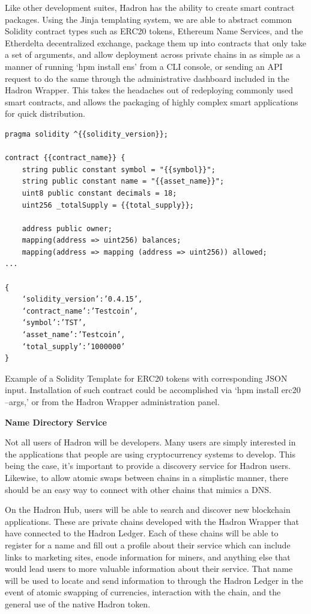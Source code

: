 \documentclass{article}
\begin{document}
Like other development suites, Hadron has the ability to create smart contract packages. Using the Jinja templating system, we are able to abstract common Solidity contract types such as ERC20 tokens, Ethereum Name Services, and the Etherdelta decentralized exchange, package them up into contracts that only take a set of arguments, and allow deployment across private chains in as simple as a manner of running ‘hpm install ens’ from a CLI console, or sending an API request to do the same through the administrative dashboard included in the Hadron Wrapper. This takes the headaches out of redeploying commonly used smart contracts, and allows the packaging of highly complex smart applications for quick distribution.

\begin{verbatim}
pragma solidity ^{{solidity_version}};

contract {{contract_name}} {
    string public constant symbol = "{{symbol}}";
    string public constant name = "{{asset_name}}";
    uint8 public constant decimals = 18;
    uint256 _totalSupply = {{total_supply}};

    address public owner;
    mapping(address => uint256) balances;
    mapping(address => mapping (address => uint256)) allowed;
...

{
    ‘solidity_version’:’0.4.15’,
    ‘contract_name’:’Testcoin’,
    ‘symbol’:’TST’,
    ‘asset_name’:’Testcoin’,
    ‘total_supply’:’1000000’
}
\end{verbatim} 

\begin{center}
Example of a Solidity Template for ERC20 tokens with corresponding JSON input. Installation of such contract could be accomplished via ‘hpm install erc20 --args,’ or from the Hadron Wrapper administration panel.
\end{center}

\begin{center}
\textbf{Name Directory Service}
\end{center}

Not all users of Hadron will be developers. Many users are simply interested in the applications that people are using cryptocurrency systems to develop. This being the case, it’s important to provide a discovery service for Hadron users. Likewise, to allow atomic swaps between chains in a simplistic manner, there should be an easy way to connect with other chains that mimics a DNS.

On the Hadron Hub, users will be able to search and discover new blockchain applications. These are private chains developed with the Hadron Wrapper that have connected to the Hadron Ledger. Each of these chains will be able to register for a name and fill out a profile about their service which can include links to marketing sites, enode information for miners, and anything else that would lead users to more valuable information about their service. That name will be used to locate and send information to through the Hadron Ledger in the event of atomic swapping of currencies, interaction with the chain, and the general use of the native Hadron token.
\end{document}

